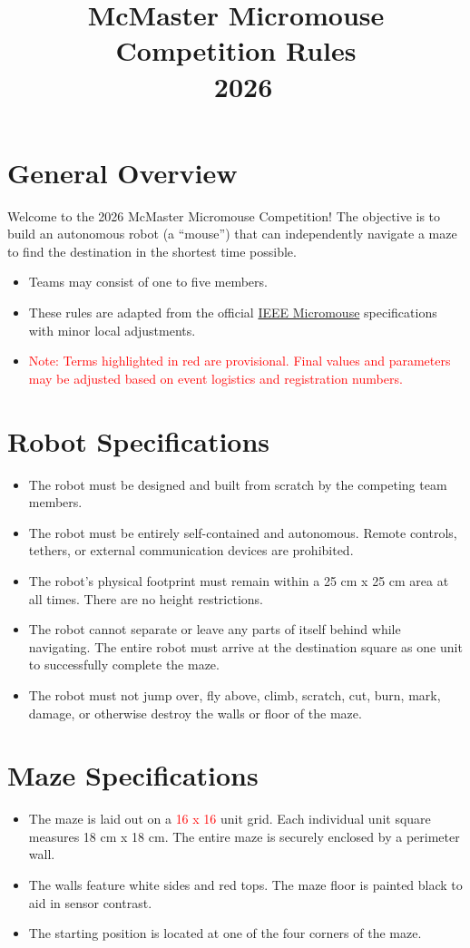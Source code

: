 \documentclass[11pt]{article}
\title{\textbf{McMaster Micromouse Competition Rules \\\ 2026}}
\author{}
\date{}
\begin{document}
\maketitle

\section*{General Overview}
Welcome to the 2026 McMaster Micromouse Competition! The objective is to build an autonomous robot (a ``mouse'') that can independently navigate a maze to find the destination in the shortest time possible. 

\begin{itemize}
    \item Teams may consist of one to five members.
    \item These rules are adapted from the official \href{https://www.overleaf.com} {IEEE Micromouse} specifications with minor local adjustments.
    \item \textcolor{red}{Note: Terms highlighted in red are provisional. Final values and parameters may be adjusted based on event logistics and registration numbers.}
\end{itemize}

\section*{Robot Specifications}
\begin{itemize}
    \item The robot must be designed and built from scratch by the competing team members. 
    \item The robot must be entirely self-contained and autonomous. Remote controls, tethers, or external communication devices are prohibited.
    \item The robot's physical footprint must remain within a 25 cm x 25 cm area at all times. There are no height restrictions.
    \item The robot cannot separate or leave any parts of itself behind while navigating. The entire robot must arrive at the destination square as one unit to successfully complete the maze.
    \item The robot must not jump over, fly above, climb, scratch, cut, burn, mark, damage, or otherwise destroy the walls or floor of the maze.
\end{itemize}

\section*{Maze Specifications}
\begin{itemize}
    \item The maze is laid out on a \textcolor{red} {16 x 16} unit grid. Each individual unit square measures 18 cm x 18 cm. The entire maze is securely enclosed by a perimeter wall.
    \item The walls feature white sides and red tops. The maze floor is painted black to aid in sensor contrast.
    \item The starting position is located at one of the four corners of the maze.
\end{itemize}
\end{document}
